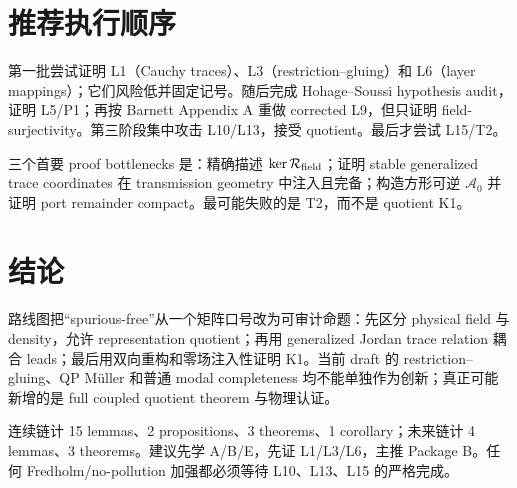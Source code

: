 \documentclass[UTF8,11pt,fontset=none]{ctexart}
\theoremstyle{definition}
\begin{document}
\section{推荐执行顺序}

第一批尝试证明 L1（Cauchy traces）、L3（restriction--gluing）和 L6（layer mappings）；它们风险低并固定记号。随后完成 Hohage--Soussi hypothesis audit，证明 L5/P1；再按 Barnett Appendix A 重做 corrected L9，但只证明 field-surjectivity。第三阶段集中攻击 L10/L13，接受 quotient。最后才尝试 L15/T2。

三个首要 proof bottlenecks 是：精确描述 $\ker\mathcal R_{\rm field}$；证明 stable generalized trace coordinates 在 transmission geometry 中注入且完备；构造方形可逆 $\mathcal A_0$ 并证明 port remainder compact。最可能失败的是 T2，而不是 quotient K1。

\section{结论}

路线图把“spurious-free”从一个矩阵口号改为可审计命题：先区分 physical field 与 density，允许 representation quotient；再用 generalized Jordan trace relation 耦合 leads；最后用双向重构和零场注入性证明 K1。当前 draft 的 restriction--gluing、QP Müller 和普通 modal completeness 均不能单独作为创新；真正可能新增的是 full coupled quotient theorem 与物理认证。

连续链计 15 lemmas、2 propositions、3 theorems、1 corollary；未来链计 4 lemmas、3 theorems。建议先学 A/B/E，先证 L1/L3/L6，主推 Package B。任何 Fredholm/no-pollution 加强都必须等待 L10、L13、L15 的严格完成。

\nocite{*}
\printbibliography[title={参考文献}]
\end{document}
